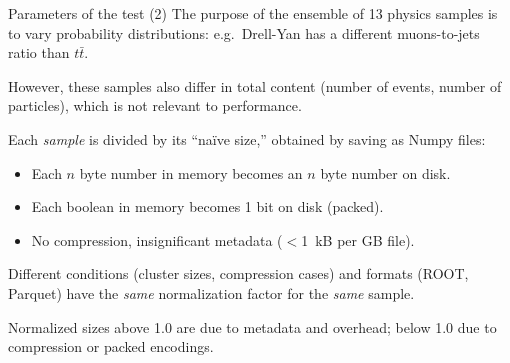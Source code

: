 \documentclass[aspectratio=169]{beamer}
\begin{document}
\begin{frame}{Parameters of the test (2)}
\vspace{0.4 cm}
The purpose of the ensemble of 13 physics samples is to vary probability distributions: e.g.\ Drell-Yan has a different muons-to-jets ratio than $t\bar{t}$.

\vspace{0.25 cm}
However, these samples also differ in total content (number of events, number of particles), which is not relevant to performance.

\vspace{0.25 cm}
Each {\it sample} is divided by its ``na\"ive size,'' obtained by saving as Numpy files:
\begin{itemize}
\item Each $n$ byte number in memory becomes an $n$ byte number on disk.
\item Each boolean in memory becomes 1 bit on disk (packed).
\item No compression, insignificant metadata ($<$1~kB per GB file).
\end{itemize}

\vspace{0.25 cm}
Different conditions (cluster sizes, compression cases) and formats (ROOT, Parquet) have the {\it same} normalization factor for the {\it same} sample.

\vspace{0.25 cm}
Normalized sizes above 1.0 are due to metadata and overhead; below 1.0 due to compression or packed encodings.
\end{frame}
\end{document}
